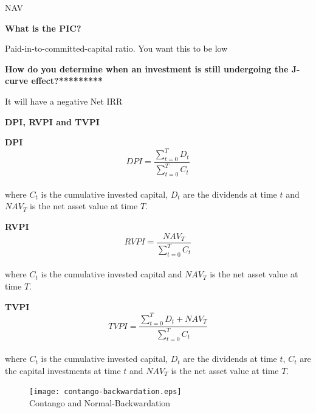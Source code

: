\documentclass[12pt]{article}
\begin{document}
\begin{framed}
NAV

\textbf{What is the PIC?}

Paid-in-to-committed-capital ratio. You want this to be low

\textbf{How do you determine when an investment is still undergoing the J-curve effect?*********}

It will have a negative Net IRR

\begin{framed}
	\textbf{DPI, RVPI and TVPI}\\
	\newline
	
	\begin{framed}
		\textbf{DPI}\\
		\begin{equation*}
		DPI = \dfrac{\sum^T_{t=0} D_t}{\sum^T_{t=0} C_t}
		\end{equation*}\\
		where $C_t$ is the cumulative invested capital, $D_t$ are the dividends at time $t$ and $NAV_T$ is the net asset value at time $T$.
		
	\end{framed}
	
	
	
	\begin{framed}
		\textbf{RVPI}\\
		\begin{equation*}
		RVPI = \dfrac{NAV_T}{\sum^T_{t=0} C_t}
		\end{equation*}\\
		where $C_t$ is the cumulative invested capital and $NAV_T$ is the net asset value at time $T$.
	\end{framed}
	
	
	
	
	\begin{framed}
		\textbf{TVPI}\\
		\begin{equation*}
		TVPI = \dfrac{\sum^T_{t=0} D_t + NAV_T}{\sum^T_{t=0} C_t}
		\end{equation*}\\
		where $C_t$ is the cumulative invested capital, $D_t$ are the dividends at time $t$, $C_t$ are the capital investments at time $t$ and $NAV_T$ is the net asset value at time $T$.
	\end{framed}
\end{framed}

\begin{figure}
		\texttt{[image: contango-backwardation.eps]}{ \\
			Contango and Normal-Backwardation }
\end{figure}


\end{framed}
\end{document}
